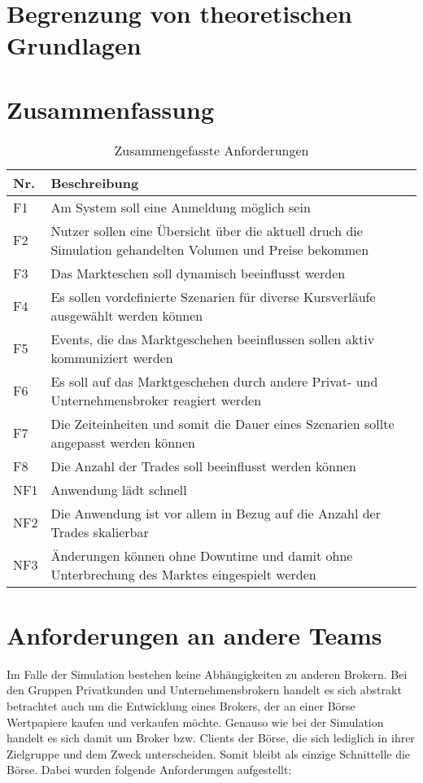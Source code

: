 \section{Begrenzung von theoretischen Grundlagen}
\section{Zusammenfassung}
	\begin{table}[h]
		\centering
		\begin{tabularx}{.8\textwidth}{l|X}
			Nr.     & Beschreibung                              \\\hline
			F1      & Am System soll eine Anmeldung möglich sein                  \\
			F2      & Nutzer sollen eine Übersicht über die aktuell druch die Simulation gehandelten Volumen und Preise bekommen  \\
			F3      & Das Markteschen soll dynamisch beeinflusst werden   \\
			F4      & Es sollen vordefinierte Szenarien für diverse Kursverläufe ausgewählt werden können \\
			F5      & Events, die das Marktgeschehen beeinflussen sollen aktiv kommuniziert werden  \\
			F6      & Es soll auf das Marktgeschehen durch andere Privat- und Unternehmensbroker reagiert werden  \\
			F7      & Die Zeiteinheiten und somit die Dauer eines Szenarien sollte angepasst werden können  \\
			F8		& Die Anzahl der Trades soll beeinflusst werden können \\\hline
			NF1     & Anwendung lädt schnell                    \\
			NF2     & Die Anwendung ist vor allem in Bezug auf die Anzahl der Trades skalierbar                \\
			NF3     & Änderungen können ohne Downtime und damit ohne Unterbrechung des Marktes eingespielt werden   \\
		\end{tabularx}
		\caption{Zusammengefasste Anforderungen}
		\label{tab:anforderungen}
	\end{table}

\section{Anforderungen an andere Teams}
	Im Falle der Simulation bestehen keine Abhängigkeiten zu anderen Brokern. Bei den Gruppen Privatkunden und Unternehmensbrokern handelt es sich abstrakt betrachtet auch um die Entwicklung eines Brokers, der an einer Börse Wertpapiere kaufen und verkaufen möchte. Genauso wie bei der Simulation handelt es sich damit um Broker bzw. Clients der Börse, die sich lediglich in ihrer Zielgruppe und dem Zweck unterscheiden. Somit bleibt als einzige Schnittelle die Börse. Dabei wurden folgende Anforderungen aufgestellt:
	
